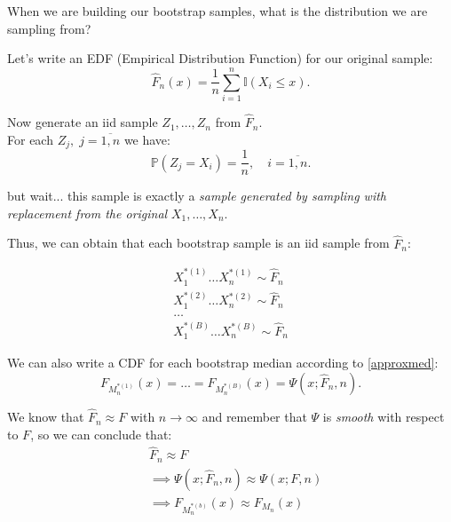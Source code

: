 \documentclass{beamer}          %
\begin{document}
\begin{frame}
  When we are building our bootstrap samples, what is the distribution we are sampling from?

  \vspace{1em}

  Let's write an EDF (Empirical Distribution Function) for our original sample:
  \begin{equation}
    \widehat{F}_n(x) = \frac{1}{n}\sum_{i=1}^{n}\mathbb{I}(X_i \leq x).
  \end{equation}

  Now generate an \textmd{iid} sample $Z_1, \hdots, Z_n$ from $\widehat{F}_n$. \\

  For each $Z_j, \; j = \overline{1, n}$ we have:
  \begin{equation}
    \mathbb{P}(Z_j = X_i) = \frac{1}{n}, \quad i = \overline{1, n}.
  \end{equation}

  but wait... this sample is  exactly a \textit{sample generated by sampling with replacement from the original} $X_1, \hdots, X_n$.

\end{frame}

\begin{frame}
  Thus, we can obtain that each bootstrap sample is an \textmd{iid} sample from $\widehat{F}_n$:

  \begin{align*}
    X_1^{*(1)} \hdots X_n^{*(1)} \sim \widehat{F}_n \\
    X_1^{*(2)} \hdots X_n^{*(2)} \sim \widehat{F}_n \\
    \hdots \\
    X_1^{*(B)} \hdots X_n^{*(B)} \sim \widehat{F}_n
  \end{align*}

  We can also write a CDF for each bootstrap median according to \eqref{approxmed}:
  \begin{equation}
    F_{M_n^{*(1)}}(x) = \hdots = F_{M_n^{*(B)}}(x) = \Psi(x; \widehat{F}_n, n).
  \end{equation}
\end{frame}

\begin{frame}
  We know that $\widehat{F}_n \approx F$ with $n \rightarrow  \infty$ and remember that $\Psi$ is \textit{smooth} with respect to $F$, so we can conclude that:
  \begin{align}
    &\widehat{F}_n \approx F \\
    &\implies \Psi(x; \widehat{F}_n, n) \approx \Psi(x; F, n) \\
    &\implies F_{M_n^{*(b)}}(x) \approx F_{M_n}(x)
  \end{align}

  \begin{center}
  \end{center}
\end{frame}
\end{document}
